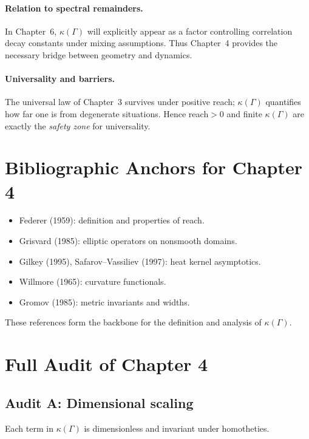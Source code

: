 \paragraph{Relation to spectral remainders.}
In Chapter~6, $\kappa(\Gamma)$ will explicitly appear as a factor controlling correlation decay constants under mixing assumptions.
Thus Chapter~4 provides the necessary bridge between geometry and dynamics.

\paragraph{Universality and barriers.}
The universal law of Chapter~3 survives under positive reach; $\kappa(\Gamma)$ quantifies how far one is from degenerate situations.
Hence reach$>0$ and finite $\kappa(\Gamma)$ are exactly the \emph{safety zone} for universality.

\section{Bibliographic Anchors for Chapter 4}
\label{sec:biblio-ch4}

\begin{itemize}
  \item Federer (1959): definition and properties of reach.
  \item Grisvard (1985): elliptic operators on nonsmooth domains.
  \item Gilkey (1995), Safarov--Vassiliev (1997): heat kernel asymptotics.
  \item Willmore (1965): curvature functionals.
  \item Gromov (1985): metric invariants and widths.
\end{itemize}

These references form the backbone for the definition and analysis of $\kappa(\Gamma)$.

\section{Full Audit of Chapter 4}
\label{sec:audit-ch4}

\subsection*{Audit A: Dimensional scaling}
Each term in $\kappa(\Gamma)$ is dimensionless and invariant under homotheties.


